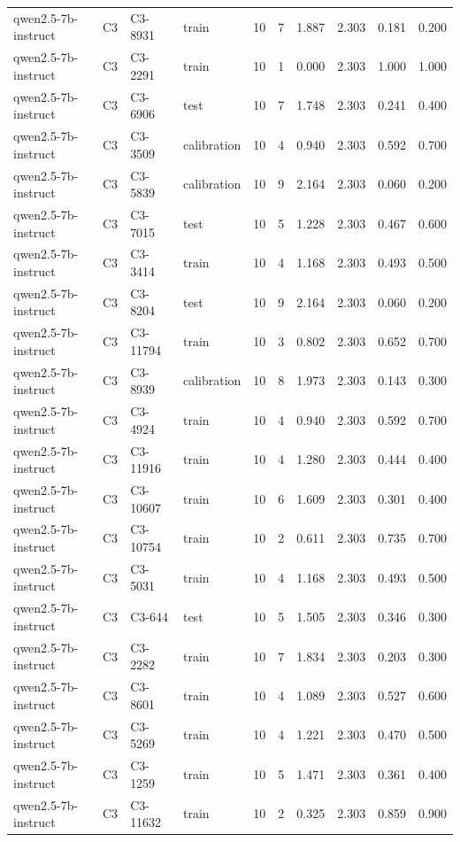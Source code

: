 \begin{table}
\begin{tabular}{llllrrrrrr}
qwen2.5-7b-instruct & C3 & C3-8931 & train & 10 & 7 & 1.887 & 2.303 & 0.181 & 0.200 \\
qwen2.5-7b-instruct & C3 & C3-2291 & train & 10 & 1 & 0.000 & 2.303 & 1.000 & 1.000 \\
qwen2.5-7b-instruct & C3 & C3-6906 & test & 10 & 7 & 1.748 & 2.303 & 0.241 & 0.400 \\
qwen2.5-7b-instruct & C3 & C3-3509 & calibration & 10 & 4 & 0.940 & 2.303 & 0.592 & 0.700 \\
qwen2.5-7b-instruct & C3 & C3-5839 & calibration & 10 & 9 & 2.164 & 2.303 & 0.060 & 0.200 \\
qwen2.5-7b-instruct & C3 & C3-7015 & test & 10 & 5 & 1.228 & 2.303 & 0.467 & 0.600 \\
qwen2.5-7b-instruct & C3 & C3-3414 & train & 10 & 4 & 1.168 & 2.303 & 0.493 & 0.500 \\
qwen2.5-7b-instruct & C3 & C3-8204 & test & 10 & 9 & 2.164 & 2.303 & 0.060 & 0.200 \\
qwen2.5-7b-instruct & C3 & C3-11794 & train & 10 & 3 & 0.802 & 2.303 & 0.652 & 0.700 \\
qwen2.5-7b-instruct & C3 & C3-8939 & calibration & 10 & 8 & 1.973 & 2.303 & 0.143 & 0.300 \\
qwen2.5-7b-instruct & C3 & C3-4924 & train & 10 & 4 & 0.940 & 2.303 & 0.592 & 0.700 \\
qwen2.5-7b-instruct & C3 & C3-11916 & train & 10 & 4 & 1.280 & 2.303 & 0.444 & 0.400 \\
qwen2.5-7b-instruct & C3 & C3-10607 & train & 10 & 6 & 1.609 & 2.303 & 0.301 & 0.400 \\
qwen2.5-7b-instruct & C3 & C3-10754 & train & 10 & 2 & 0.611 & 2.303 & 0.735 & 0.700 \\
qwen2.5-7b-instruct & C3 & C3-5031 & train & 10 & 4 & 1.168 & 2.303 & 0.493 & 0.500 \\
qwen2.5-7b-instruct & C3 & C3-644 & test & 10 & 5 & 1.505 & 2.303 & 0.346 & 0.300 \\
qwen2.5-7b-instruct & C3 & C3-2282 & train & 10 & 7 & 1.834 & 2.303 & 0.203 & 0.300 \\
qwen2.5-7b-instruct & C3 & C3-8601 & train & 10 & 4 & 1.089 & 2.303 & 0.527 & 0.600 \\
qwen2.5-7b-instruct & C3 & C3-5269 & train & 10 & 4 & 1.221 & 2.303 & 0.470 & 0.500 \\
qwen2.5-7b-instruct & C3 & C3-1259 & train & 10 & 5 & 1.471 & 2.303 & 0.361 & 0.400 \\
qwen2.5-7b-instruct & C3 & C3-11632 & train & 10 & 2 & 0.325 & 2.303 & 0.859 & 0.900 \\

\end{tabular}
\end{table}
